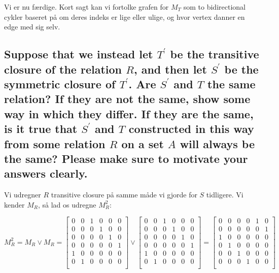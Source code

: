 \documentclass[a4paper,12pt]{article}
\begin{document}
Vi er nu færdige. Kort sagt kan vi fortolke grafen for $M_T$ som to bidirectional cykler baseret på om deres indeks er lige eller ulige, og hvor vertex danner en edge med sig selv.

\subsection[]{Suppose that we instead let $T^\prime$ be the transitive closure of the relation $R$, and then let
$S^\prime$ be the symmetric closure of $T^\prime$. Are $S^\prime$ and $T$ the same relation? If they are not the
same, show some way in which they differ. If they are the same, is it true that $S^\prime$ and $T$
constructed in this way from some relation $R$ on a set $A$ will always be the same? Please
make sure to motivate your answers clearly.
}

Vi udregner $R$ transitive closure på samme måde vi gjorde for $S$ tidligere. Vi kender $M_R$, så lad os udregne $M^2_R$:

\[M^2_R = M_R \lor M_R =
\begin{bmatrix}
    0 & 0 & 1 & 0 & 0 & 0 \\
    0 & 0 & 0 & 1 & 0 & 0 \\
    0 & 0 & 0 & 0 & 1 & 0 \\
    0 & 0 & 0 & 0 & 0 & 1 \\
    1 & 0 & 0 & 0 & 0 & 0 \\
    0 & 1 & 0 & 0 & 0 & 0 \\
\end{bmatrix}
\lor
\begin{bmatrix}
    0 & 0 & 1 & 0 & 0 & 0 \\
    0 & 0 & 0 & 1 & 0 & 0 \\
    0 & 0 & 0 & 0 & 1 & 0 \\
    0 & 0 & 0 & 0 & 0 & 1 \\
    1 & 0 & 0 & 0 & 0 & 0 \\
    0 & 1 & 0 & 0 & 0 & 0 \\
\end{bmatrix}
=
\begin{bmatrix}
    0 & 0 & 0 & 0 & 1 & 0 \\
    0 & 0 & 0 & 0 & 0 & 1 \\
    1 & 0 & 0 & 0 & 0 & 0 \\
    0 & 1 & 0 & 0 & 0 & 0 \\
    0 & 0 & 1 & 0 & 0 & 0 \\
    0 & 0 & 0 & 1 & 0 & 0 \\
\end{bmatrix}
\]
\end{document}
